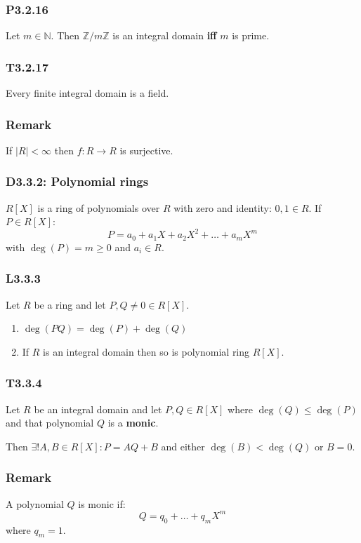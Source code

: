 \documentclass{article}
\begin{document}
\begin{multicols*}{3}
\subsubsection*{P3.2.16}
Let $m\in\mathbb{N}$. Then $\mathbb{Z}/m\mathbb{Z}$ 
is an integral domain \textbf{if{}f} $m$ is prime.

\subsubsection*{T3.2.17}
Every finite integral domain is a field.

\subsubsection*{Remark}
If $|R|<\infty$ then $f:R\rightarrow R$ is surjective.

\subsubsection*{D3.3.2: Polynomial rings}
$R[X]$ is a ring of polynomials over $R$ 
with zero and identity: $0,1\in R$. If $P\in R[X]$:
$$P=a_0+a_1 X+a_2 X^2+\dots+a_m X^m$$
with $\deg(P)=m\geq0$ and $a_i\in R$.

\subsubsection*{L3.3.3}
Let $R$ be a ring and let $P,Q\neq0\in R[X]$.
\begin{enumerate}
    \item $\deg(PQ)=\deg(P)+\deg(Q)$
    \item If $R$ is an integral domain then
    so is polynomial ring $R[X]$.
\end{enumerate}

\subsubsection*{T3.3.4}
Let $R$ be an integral domain and
let $P,Q\in R[X]$ where $\deg(Q)\leq\deg(P)$
and that polynomial $Q$ is a \textbf{monic}.

Then $\exists!A,B\in R[X]:P=AQ+B$ and either
$\deg(B)<\deg(Q)$ or $B=0$.

\subsubsection*{Remark}
A polynomial $Q$ is monic if:
$$Q=q_0+\dots+q_m X^m$$
where $q_m=1$.


\end{multicols*}
\end{document}
